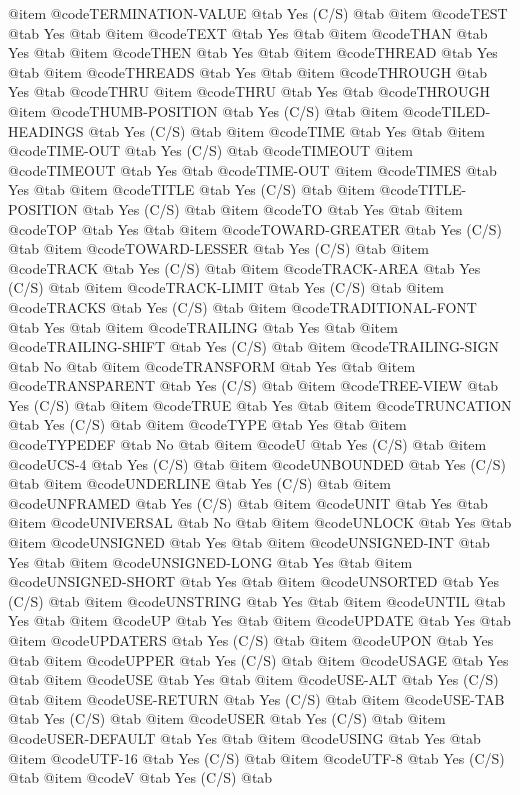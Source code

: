@item @code{TERMINATION-VALUE} @tab Yes	(C/S) @tab
@item @code{TEST} @tab Yes @tab
@item @code{TEXT} @tab Yes @tab
@item @code{THAN} @tab Yes @tab
@item @code{THEN} @tab Yes @tab
@item @code{THREAD} @tab Yes @tab
@item @code{THREADS} @tab Yes @tab
@item @code{THROUGH} @tab Yes @tab @code{THRU}
@item @code{THRU} @tab Yes @tab @code{THROUGH}
@item @code{THUMB-POSITION} @tab Yes	(C/S) @tab
@item @code{TILED-HEADINGS} @tab Yes	(C/S) @tab
@item @code{TIME} @tab Yes @tab
@item @code{TIME-OUT} @tab Yes	(C/S) @tab @code{TIMEOUT}
@item @code{TIMEOUT} @tab Yes @tab @code{TIME-OUT}
@item @code{TIMES} @tab Yes @tab
@item @code{TITLE} @tab Yes	(C/S) @tab
@item @code{TITLE-POSITION} @tab Yes	(C/S) @tab
@item @code{TO} @tab Yes @tab
@item @code{TOP} @tab Yes @tab
@item @code{TOWARD-GREATER} @tab Yes	(C/S) @tab
@item @code{TOWARD-LESSER} @tab Yes	(C/S) @tab
@item @code{TRACK} @tab Yes (C/S) @tab
@item @code{TRACK-AREA} @tab Yes (C/S) @tab
@item @code{TRACK-LIMIT} @tab Yes (C/S) @tab
@item @code{TRACKS} @tab Yes (C/S) @tab
@item @code{TRADITIONAL-FONT} @tab Yes @tab
@item @code{TRAILING} @tab Yes @tab
@item @code{TRAILING-SHIFT} @tab Yes	(C/S) @tab
@item @code{TRAILING-SIGN} @tab No @tab
@item @code{TRANSFORM} @tab Yes @tab
@item @code{TRANSPARENT} @tab Yes	(C/S) @tab
@item @code{TREE-VIEW} @tab Yes	(C/S) @tab
@item @code{TRUE} @tab Yes @tab
@item @code{TRUNCATION} @tab Yes	(C/S) @tab
@item @code{TYPE} @tab Yes @tab
@item @code{TYPEDEF} @tab No @tab
@item @code{U} @tab Yes	(C/S) @tab
@item @code{UCS-4} @tab Yes	(C/S) @tab
@item @code{UNBOUNDED} @tab Yes	(C/S) @tab
@item @code{UNDERLINE} @tab Yes	(C/S) @tab
@item @code{UNFRAMED} @tab Yes	(C/S) @tab
@item @code{UNIT} @tab Yes @tab
@item @code{UNIVERSAL} @tab No @tab
@item @code{UNLOCK} @tab Yes @tab
@item @code{UNSIGNED} @tab Yes @tab
@item @code{UNSIGNED-INT} @tab Yes @tab
@item @code{UNSIGNED-LONG} @tab Yes @tab
@item @code{UNSIGNED-SHORT} @tab Yes @tab
@item @code{UNSORTED} @tab Yes	(C/S) @tab
@item @code{UNSTRING} @tab Yes @tab
@item @code{UNTIL} @tab Yes @tab
@item @code{UP} @tab Yes @tab
@item @code{UPDATE} @tab Yes @tab
@item @code{UPDATERS} @tab Yes	(C/S) @tab
@item @code{UPON} @tab Yes @tab
@item @code{UPPER} @tab Yes	(C/S) @tab
@item @code{USAGE} @tab Yes @tab
@item @code{USE} @tab Yes @tab
@item @code{USE-ALT} @tab Yes	(C/S) @tab
@item @code{USE-RETURN} @tab Yes	(C/S) @tab
@item @code{USE-TAB} @tab Yes	(C/S) @tab
@item @code{USER} @tab Yes	(C/S) @tab
@item @code{USER-DEFAULT} @tab Yes @tab
@item @code{USING} @tab Yes @tab
@item @code{UTF-16} @tab Yes	(C/S) @tab
@item @code{UTF-8} @tab Yes	(C/S) @tab
@item @code{V} @tab Yes	(C/S) @tab
